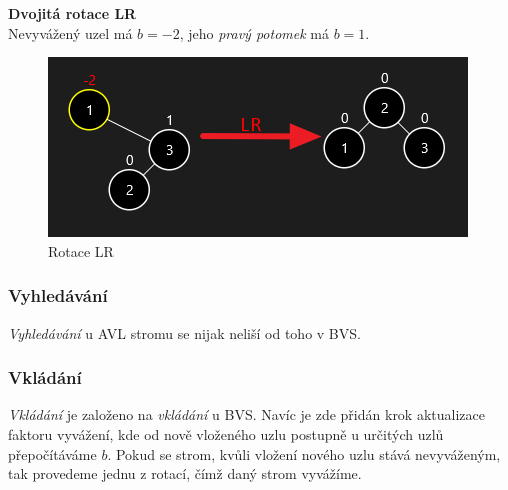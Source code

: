 \documentclass[
  biblatex=false,
  font=serif,
  glossaries=false,
  tables=false,
  theorems=false,
  index
]{kidiplom}
\begin{document}
\noindent\textbf{Dvojitá rotace LR}\\
\noindent Nevyvážený uzel má $b = -2$, jeho \textit{pravý potomek} má $b = 1$.
\begin{figure}[h!]
\centering
	\includegraphics[scale=0.8]{obrazky/14LR.png}
	\caption{Rotace LR}
\end{figure}

\subsubsection{Vyhledávání}
\indent\indent \textit{Vyhledávání} u AVL stromu se nijak neliší od toho v BVS.

\subsubsection{Vkládání}
\indent\indent \textit{Vkládání} je založeno na \textit{vkládání} u BVS. Navíc je zde přidán krok aktualizace faktoru vyvážení, kde od nově vloženého uzlu postupně u určitých uzlů přepočítáváme $b$. Pokud se strom, kvůli vložení nového uzlu stává nevyváženým, tak provedeme jednu z rotací, čímž daný strom vyvážíme.\\
\end{document}
